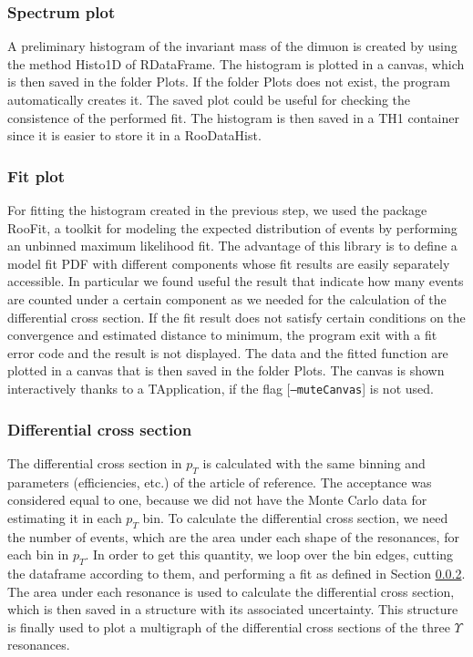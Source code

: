 \documentclass[a4paper,11pt]{article}
\begin{document}
\subsubsection{Spectrum plot}
A preliminary histogram of the invariant mass of the dimuon is created by using the method Histo1D of RDataFrame. The histogram is plotted in a canvas, which is then saved in the folder Plots. If the folder Plots does not exist, the program automatically creates it. The saved plot could be useful for checking the consistence of the performed fit. The histogram is then saved in a TH1 container since it is easier to store it in a RooDataHist.

\subsubsection{Fit plot}\label{fit}
For fitting the histogram created in the previous step, we used the package RooFit, a toolkit for modeling the expected distribution of events by performing an unbinned maximum likelihood fit. The advantage of this library is to define a model fit PDF with different components whose fit results are easily separately accessible. In particular we found useful the result that indicate how many events are counted under a certain component as we needed for the calculation of the differential cross section. 
If the fit result does not satisfy certain conditions on the convergence and estimated distance to minimum, the program exit with a fit error code and the result is not displayed.
The data and the fitted function are plotted in a canvas that is then saved in the folder Plots. The canvas is shown interactively thanks to a TApplication, if the flag [\texttt{--muteCanvas}] is not used.

\subsubsection{Differential cross section}
The differential cross section in $p_T$ is calculated with the same binning and parameters (efficiencies, etc.) of the article of reference. The acceptance was considered equal to one, because we did not have the Monte Carlo data for estimating it in each $p_T$ bin. 
To calculate the differential cross section, we need the number of events, which are the area under each shape of the resonances, for each bin in $p_T$. In order to get this quantity, we loop over the bin edges, cutting the dataframe according to them, and performing a fit as defined in Section \ref{fit}. The area under each resonance is used to calculate the differential cross section, which is then saved in a structure with its associated uncertainty. This structure is finally used to plot a multigraph of the differential cross sections of the three $\Upsilon$ resonances.
\end{document}
